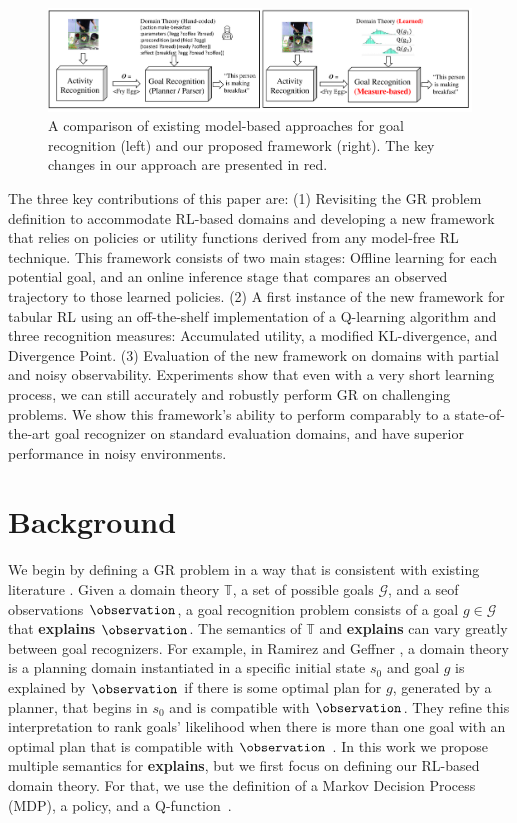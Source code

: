 \documentclass[letterpaper]{article} %
\providecommand\initialstate{\ensuremath{s_{0}}}
\providecommand\theory{\mathbb{T}}
\providecommand\goals{\mathcal{G}}
\providecommand\goal{g}
\begin{document}
\begin{figure}[t]
    \centering
    \includegraphics[width=\textwidth]{Figures/cooking-new.pdf}
    \caption{A comparison of existing model-based approaches for goal recognition (left) and our proposed framework (right). The key changes in our approach are presented in red.}
    \label{fig:cooking}
\end{figure}

The three key contributions of this paper are:
(1) Revisiting the GR problem definition to accommodate RL-based domains and developing a new framework that relies on policies or utility functions derived from any model-free RL technique. This framework consists of two main stages: Offline learning
for each potential goal, and an online inference stage that compares an observed trajectory to those learned policies.
(2) A first instance of the new framework for tabular RL
using an off-the-shelf implementation of a Q-learning algorithm and three recognition measures: Accumulated utility, a modified KL-divergence, and Divergence Point.
(3) Evaluation of the new framework
on domains with partial and noisy observability.
Experiments show that even with a very short learning process, we can still accurately and robustly perform GR on challenging problems.
We show this framework's ability to perform comparably to a state-of-the-art goal recognizer on standard evaluation domains, and have superior performance in noisy environments.

\section{Background}
\label{sec:background}

We begin by defining a GR problem in a way that is consistent with existing literature \cite{Meneguzzi2021,mirsky2021introduction}. Given a domain theory $\theory$, a set of possible goals $\goals$, and a seof observations $\observation$, a goal recognition problem consists of a goal $\goal \in \goals$ that \textbf{explains} $\observation$. %
The semantics of $\theory$ and \textbf{explains} can vary greatly between goal recognizers.
For example, in Ramirez and Geffner , a domain theory is a planning domain instantiated in a specific initial state $\initialstate$ and goal $\goal$ is explained by $\observation$ if there is some optimal plan for $\goal$, generated by a planner, that begins in $\initialstate$ and is compatible with $\observation$.
They refine this interpretation to rank goals' likelihood when there is more than one goal with an optimal plan that is compatible with $\observation$ \cite{ramirez2010probabilistic}.
In this work we propose multiple semantics for \textbf{explains}, but we first focus on defining our RL-based domain theory.
For that, we use the definition of a Markov Decision Process (MDP), a policy, and a Q-function~\cite{sutton2018reinforcement}.
\end{document}

